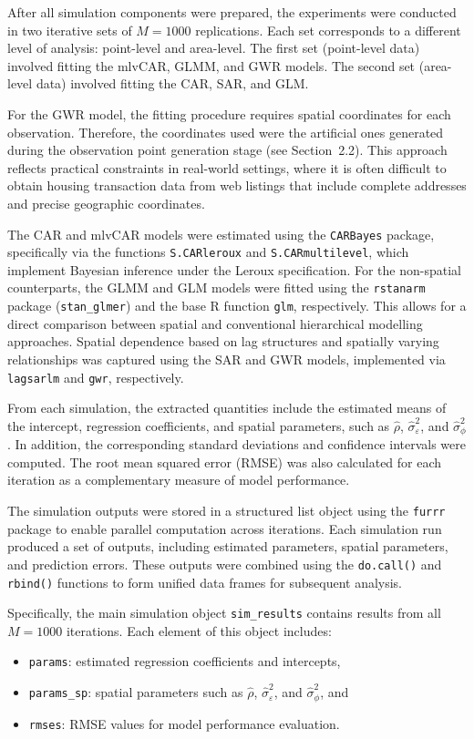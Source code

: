 \documentclass[a4paper,reqno]{amsart}
\begin{document}
After all simulation components were prepared, the experiments were
conducted in two iterative sets of $M = 1000$ replications. Each set
corresponds to a different level of analysis: point-level and
area-level. The first set (point-level data) involved fitting the
mlvCAR, GLMM, and GWR models. The second set
(area-level data) involved fitting the CAR, SAR, and GLM.

For the GWR model, the fitting procedure requires spatial coordinates
for each observation. Therefore, the coordinates used were the
artificial ones generated during the observation point generation stage
(see Section~2.2). This approach reflects practical constraints in
real-world settings, where it is often difficult to obtain housing
transaction data from web listings that include complete addresses and
precise geographic coordinates.

The CAR and mlvCAR models were estimated using the
\texttt{CARBayes} package, specifically via the functions
\texttt{S.CARleroux} and \texttt{S.CARmultilevel}, which implement
Bayesian inference under the Leroux specification. For the
non-spatial counterparts, the GLMM and GLM models were fitted using the
\texttt{rstanarm} package (\texttt{stan\_glmer}) and the base R function
\texttt{glm}, respectively. This allows for a direct comparison between
spatial and conventional hierarchical modelling approaches. Spatial
dependence based on lag structures and spatially varying relationships
was captured using the SAR and GWR models, implemented via
\texttt{lagsarlm} and \texttt{gwr}, respectively.

From each simulation, the extracted quantities include the estimated
means of the intercept, regression coefficients, and spatial parameters,
such as $\hat{\rho}$, $\hat{\sigma}^2_{\varepsilon}$, and
$\hat{\sigma}^2_{\phi}$. In addition, the corresponding standard
deviations and confidence intervals were computed. The root mean squared
error (RMSE) was also calculated for each iteration as a complementary
measure of model performance.

The simulation outputs were stored in a structured list object using the
\texttt{furrr} package to enable parallel computation across iterations.
Each simulation run produced a set of outputs, including estimated
parameters, spatial parameters, and prediction errors. These outputs
were combined using the \texttt{do.call()} and \texttt{rbind()} functions
to form unified data frames for subsequent analysis.

Specifically, the main simulation object \texttt{sim\_results}
contains results from all $M = 1000$ iterations. Each element of this
object includes:
\begin{itemize}
\item \texttt{params}: estimated regression coefficients and intercepts,
\item \texttt{params\_sp}: spatial parameters such as $\hat{\rho}$,
$\hat{\sigma}^2_{\varepsilon}$, and $\hat{\sigma}^2_{\phi}$, and
\item \texttt{rmses}: RMSE values for model performance evaluation.
\end{itemize}
\end{document}

